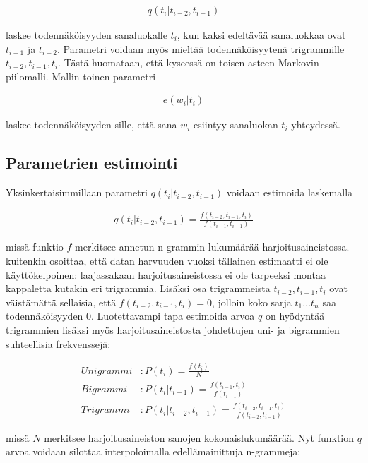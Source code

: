 \documentclass[utf8,bachelor,manualbib]{gradu3}
\begin{document}
\begin{align}
q(t_i | t_{i-2}, t_{i-1})
\end{align}

laskee todennäköisyyden sanaluokalle $t_i$, kun kaksi edeltävää sanaluokkaa ovat $t_{i-1}$ ja $t_{i-2}$. Parametri voidaan myös mieltää todennäköisyytenä trigrammille $t_{i-2}, t_{i-1}, t_i $. Tästä huomataan, että kyseessä on toisen asteen Markovin piilomalli. Mallin toinen parametri

\begin{align}
e(w_i | t_i)
\end{align}

laskee todennäköisyyden sille, että sana $w_i$ esiintyy sanaluokan $t_i$ yhteydessä.


\subsection{Parametrien estimointi}

Yksinkertaisimmillaan parametri $q(t_i|t_{i-2},t_{i-1})$ voidaan estimoida laskemalla

\begin{align}
q(t_i|t_{i-2},t_{i-1}) = \frac{f(t_{i-2},t_{i-1},t_i)}{f(t_{i-1},t_{i-1})}
\end{align}

missä funktio $f$ merkitsee annetun n-grammin lukumäärää harjoitusaineistossa. \citet{brants2000} kuitenkin osoittaa, että datan harvuuden vuoksi tällainen estimaatti ei ole käyttökelpoinen: laajassakaan harjoitusaineistossa ei ole tarpeeksi montaa kappaletta kutakin eri trigrammia. Lisäksi osa trigrammeista $t_{i-2},t_{i-1},t_i$ ovat väistämättä sellaisia, että $f(t_{i-2},t_{i-1},t_i) = 0$, jolloin koko sarja $t_1 \ldots t_n$ saa todennäköisyyden $0$. Luotettavampi tapa estimoida arvoa $q$ on hyödyntää trigrammien lisäksi myös harjoitusaineistosta johdettujen uni- ja bigrammien suhteellisia frekvenssejä:

\begin{align}
Unigrammi&: P(t_i) = \frac{f(t_i)}{N} \\
Bigrammi&: P(t_i | t_{i-1}) = \frac{f(t_{i-1}, t_i)}{f(t_{i-1})} \\
Trigrammi&: P(t_i | t_{i-2}, t_{i-1}) = \frac{f(t_{i-2},t_{i-1},t_i)}{f(t_{i-2},t_{i-1})}
\end{align}

missä $N$ merkitsee harjoitusaineiston sanojen kokonaislukumäärää. Nyt funktion $q$ arvoa voidaan silottaa interpoloimalla edellämainittuja n-grammeja:
\end{document}
